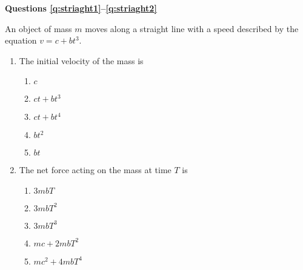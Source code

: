 \documentclass{../../../oss-apphys}
\begin{document}
\begin{multicols}{2}
  \textbf{Questions \ref{q:striaght1}--\ref{q:striaght2}}

  An object of mass $m$ moves along a straight line with a speed described by
  the equation $v=c+bt^3$.
  \begin{enumerate}[resume,leftmargin=18pt]
  \item The initial velocity of the mass is
    \begin{enumerate}[noitemsep,topsep=0pt,leftmargin=18pt,label=(\Alph*)]
    \item $c$
    \item $ct+bt^3$
    \item $ct+bt^4$
    \item $bt^2$
    \item $bt$
    \end{enumerate}
    \label{q:striaght1}

  \item The net force acting on the mass at time $T$ is
    \begin{enumerate}[noitemsep,topsep=0pt,leftmargin=18pt,label=(\Alph*)]
    \item $3mbT$
    \item $3mbT^2$
    \item $3mbT^3$
    \item $mc+2mbT^2$
    \item $mc^2+4mbT^4$
    \end{enumerate}
    \label{q:striaght2}


  \end{enumerate}
  

\end{multicols}
\end{document}
